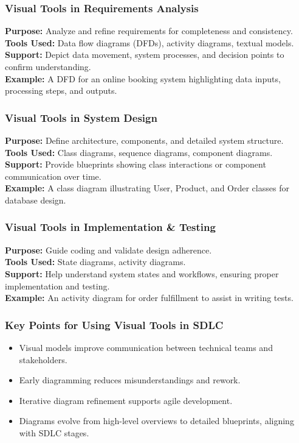 \documentclass{beamer}
\begin{document}
\begin{frame}[fragile]
    \frametitle{Visual Tools in Requirements Analysis}
    \textbf{Purpose:} Analyze and refine requirements for completeness and consistency. \\
    \textbf{Tools Used:} Data flow diagrams (DFDs), activity diagrams, textual models. \\
    \textbf{Support:} Depict data movement, system processes, and decision points to confirm understanding. \\
    \textbf{Example:} A DFD for an online booking system highlighting data inputs, processing steps, and outputs.
\end{frame}

\begin{frame}[fragile]
    \frametitle{Visual Tools in System Design}
    \textbf{Purpose:} Define architecture, components, and detailed system structure. \\
    \textbf{Tools Used:} Class diagrams, sequence diagrams, component diagrams. \\
    \textbf{Support:} Provide blueprints showing class interactions or component communication over time. \\
    \textbf{Example:} A class diagram illustrating User, Product, and Order classes for database design.
\end{frame}

\begin{frame}[fragile]
    \frametitle{Visual Tools in Implementation & Testing}
    \textbf{Purpose:} Guide coding and validate design adherence. \\
    \textbf{Tools Used:} State diagrams, activity diagrams. \\
    \textbf{Support:} Help understand system states and workflows, ensuring proper implementation and testing. \\
    \textbf{Example:} An activity diagram for order fulfillment to assist in writing tests.
\end{frame}

\begin{frame}[fragile]
    \frametitle{Key Points for Using Visual Tools in SDLC}
    \begin{itemize}
        \item Visual models improve communication between technical teams and stakeholders.
        \item Early diagramming reduces misunderstandings and rework.
        \item Iterative diagram refinement supports agile development.
        \item Diagrams evolve from high-level overviews to detailed blueprints, aligning with SDLC stages.
    \end{itemize}
\end{frame}
\end{document}
